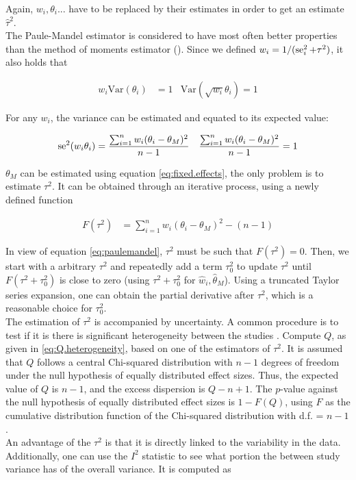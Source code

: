 \documentclass[11pt,a4paper,twoside]{book}\usepackage[]{graphicx}\usepackage[]{color}
\begin{document}
Again, $w_i, \theta_i ...$ have to be replaced by their estimates in order to get an estimate $\hat{\tau}^2$. \\
The Paule-Mandel estimator \citep{paulemandel} is considered to have most often better properties than the method of moments estimator (\eg \citet{tau.estimator.evaluation}).
Since we defined $w_i = 1/(\operatorname{se}_i^2 + \tau^2)$, it also holds that

\begin{align}
w_i \textrm{Var}(\theta_i) &= 1 & \textrm{Var}(\sqrt{w_i}\theta_i) = 1 \nonumber
\end{align}

For any $w_i$, the variance can be estimated and equated to its expected value:

\begin{align}
\operatorname{se}^2(w_i\theta_i) &= \frac{\sum_{i = 1}^n w_i(\theta_i - \theta_M)^2}{n-1} & \frac{\sum_{i = 1}^n w_i(\theta_i - \theta_M)^2}{n-1} = 1 \label{eq:paulemandel}
\end{align}

$\theta_M$ can be estimated using equation \eqref{eq:fixed.effects}, the only problem is to estimate $\tau^2$. It can be obtained through an iterative process, using a newly defined function

\begin{align}
F(\tau^2) &= \sum_{i = 1}^n w_i(\theta_i - \theta_M)^2 - (n-1) \nonumber
\end{align}

In view of equation \eqref{eq:paulemandel}, $\tau^2$ must be such that $F(\tau^2) = 0$. Then, we start with a arbitrary $\tau^2$ and repeatedly add a term $\tau_0^2$ to update $\tau^2$ until $F(\tau^2 + \tau_0^2)$ is close to zero (using $\tau^2 + \tau_0^2$ for $\hat{w}_i, \hat{\theta}_M$). Using a truncated Taylor series expansion, one can obtain the partial derivative after $\tau^2$, which is a reasonable choice for $\tau_0^2$. \\
The estimation of $\tau^2$ is accompanied by uncertainty. A common procedure is to test if it is there is significant heterogeneity between the studies \cite[109]{Intro.meta}. Compute $Q$, as given in \eqref{eq:Q.heterogeneity}, based on one of the estimators of $\tau^2$. It is assumed that $Q$ follows a central Chi-squared distribution with $n -1$ degrees of freedom under the null hypothesis of equally distributed effect sizes. Thus, the expected value of $Q$ is $n-1$, and the excess dispersion is $Q - n + 1$. The $p$-value against the null hypothesis of equally distributed effect sizes is $1 - F(Q)$, using $F$ as the cumulative distribution function of the Chi-squared distribution with d.f. = $n-1$. \\
An advantage of the $\tau^2$ is that it is directly linked to the variability in the data. Additionally, one can use the $I^2$ statistic to see what portion the between study variance has of the overall variance. It is computed as
\end{document}
